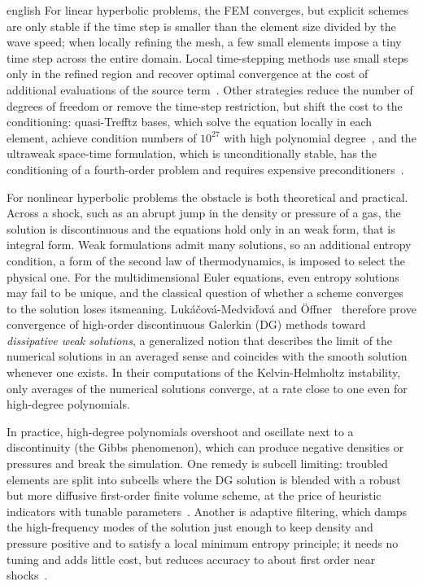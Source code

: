 \documentclass[../0000.tex]{subfiles}
\begin{document}
\begin{hyphenrules}{english}
For linear hyperbolic problems, the FEM converges, but explicit schemes are only stable if the time step is smaller than the element size divided by the
wave speed; when locally refining the mesh, a few small elements impose a tiny time step across the entire domain. Local time-stepping
methods use small steps only in the refined region and recover optimal convergence at the cost of additional evaluations of the
source term~\cite{grote2026explicit}. Other strategies reduce the number of degrees of freedom or remove the time-step restriction, but shift the cost to
the conditioning: quasi-Trefftz bases, which solve the equation locally in each element, achieve condition numbers of $10^{27}$ with high polynomial
degree~\cite{imbert2023space}, and the ultraweak space-time formulation, which is unconditionally stable, has the conditioning of a fourth-order
problem and requires expensive preconditioners~\cite{henning2022ultraweak}.

For nonlinear hyperbolic problems the obstacle is both theoretical and practical. Across a shock, such as an abrupt jump in the density or pressure of
a gas, the solution is discontinuous and the equations hold only in an weak form, that is integral form. Weak formulations admit many solutions, so an
additional entropy condition, a form of the second law of thermodynamics, is imposed to select the physical one. For the multidimensional Euler equations, 
even entropy solutions may fail to be unique, and the classical question of whether a scheme converges to the solution loses itsmeaning. 
Luk\'a\v{c}ov\'a-Medvi\v{d}ov\'a and \"Offner~\cite{lukavcova2023convergence} therefore prove convergence of high-order discontinuous Galerkin (DG) methods
toward \emph{dissipative weak solutions}, a generalized notion that describes the limit of the numerical solutions in an averaged sense and coincides with
the smooth solution whenever one exists. In their computations of the Kelvin-Helmholtz instability, only averages of the numerical solutions converge, 
at a rate close to one even for high-degree polynomials.

In practice, high-degree polynomials overshoot and oscillate next to a discontinuity (the Gibbs phenomenon), which can produce negative densities or
pressures and break the simulation. One remedy is subcell limiting: troubled elements are split into subcells where the DG solution is blended with a
robust but more diffusive first-order finite volume scheme, at the price of heuristic indicators with tunable parameters~\cite{rueda2022subcell}. Another
is adaptive filtering, which damps the high-frequency modes of the solution just enough to keep density and pressure positive and to satisfy a local 
minimum entropy principle; it needs no tuning and adds little cost, but reduces accuracy to about first order near shocks~\cite{dzanic2022positivity}.


\end{hyphenrules}
\end{document}

